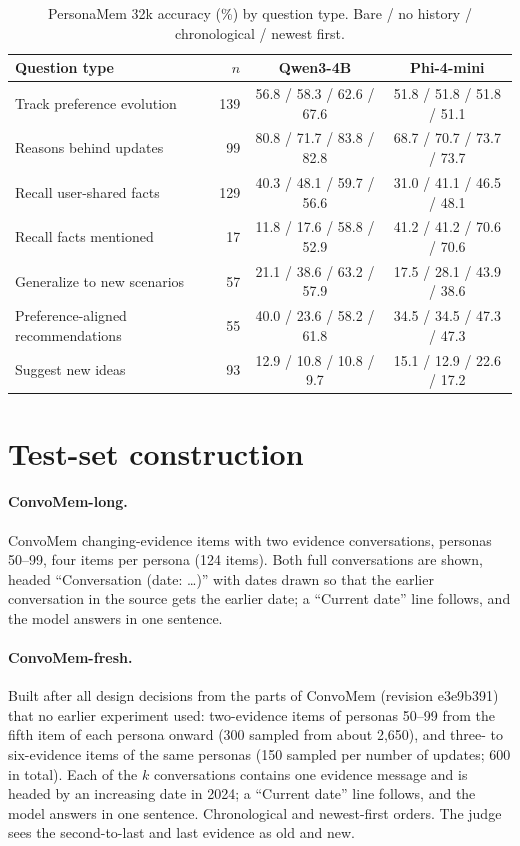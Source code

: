 \documentclass[11pt]{article}
\begin{document}
\begin{table}[h]
\centering\small
\caption{PersonaMem 32k accuracy (\%) by question type. Bare / no history / chronological / newest first.}
\label{tab:pm}
\begin{tabular}{@{}lrcc@{}}
\toprule
Question type & $n$ & Qwen3-4B & Phi-4-mini \\
\midrule
Track preference evolution & 139 & 56.8 / 58.3 / 62.6 / 67.6 & 51.8 / 51.8 / 51.8 / 51.1 \\
Reasons behind updates & 99 & 80.8 / 71.7 / 83.8 / 82.8 & 68.7 / 70.7 / 73.7 / 73.7 \\
Recall user-shared facts & 129 & 40.3 / 48.1 / 59.7 / 56.6 & 31.0 / 41.1 / 46.5 / 48.1 \\
Recall facts mentioned & 17 & 11.8 / 17.6 / 58.8 / 52.9 & 41.2 / 41.2 / 70.6 / 70.6 \\
Generalize to new scenarios & 57 & 21.1 / 38.6 / 63.2 / 57.9 & 17.5 / 28.1 / 43.9 / 38.6 \\
Preference-aligned recommendations & 55 & 40.0 / 23.6 / 58.2 / 61.8 & 34.5 / 34.5 / 47.3 / 47.3 \\
Suggest new ideas & 93 & 12.9 / 10.8 / 10.8 / 9.7 & 15.1 / 12.9 / 22.6 / 17.2 \\
\bottomrule
\end{tabular}
\end{table}

\section{Test-set construction}
\label{app:sets}

\paragraph{ConvoMem-long.} ConvoMem changing-evidence items with two evidence conversations, personas 50--99, four items per persona (124 items). Both full conversations are shown, headed ``Conversation (date: \ldots)'' with dates drawn so that the earlier conversation in the source gets the earlier date; a ``Current date'' line follows, and the model answers in one sentence.

\paragraph{ConvoMem-fresh.} Built after all design decisions from the parts of ConvoMem (revision e3e9b391) that no earlier experiment used: two-evidence items of personas 50--99 from the fifth item of each persona onward (300 sampled from about 2{,}650), and three- to six-evidence items of the same personas (150 sampled per number of updates; 600 in total). Each of the $k$ conversations contains one evidence message and is headed by an increasing date in 2024; a ``Current date'' line follows, and the model answers in one sentence. Chronological and newest-first orders. The judge sees the second-to-last and last evidence as old and new.
\end{document}

